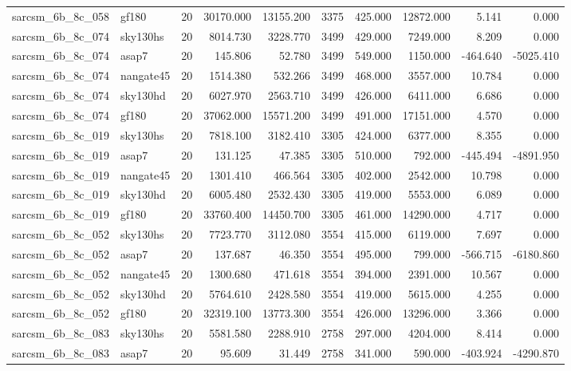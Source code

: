 \begin{tabular}{llrrrrrrrr}
sarcsm\_6b\_8c\_058 & gf180 & 20 & 30170.000 & 13155.200 & 3375 & 425.000 & 12872.000 & 5.141 & 0.000 \\
sarcsm\_6b\_8c\_074 & sky130hs & 20 & 8014.730 & 3228.770 & 3499 & 429.000 & 7249.000 & 8.209 & 0.000 \\
sarcsm\_6b\_8c\_074 & asap7 & 20 & 145.806 & 52.780 & 3499 & 549.000 & 1150.000 & -464.640 & -5025.410 \\
sarcsm\_6b\_8c\_074 & nangate45 & 20 & 1514.380 & 532.266 & 3499 & 468.000 & 3557.000 & 10.784 & 0.000 \\
sarcsm\_6b\_8c\_074 & sky130hd & 20 & 6027.970 & 2563.710 & 3499 & 426.000 & 6411.000 & 6.686 & 0.000 \\
sarcsm\_6b\_8c\_074 & gf180 & 20 & 37062.000 & 15571.200 & 3499 & 491.000 & 17151.000 & 4.570 & 0.000 \\
sarcsm\_6b\_8c\_019 & sky130hs & 20 & 7818.100 & 3182.410 & 3305 & 424.000 & 6377.000 & 8.355 & 0.000 \\
sarcsm\_6b\_8c\_019 & asap7 & 20 & 131.125 & 47.385 & 3305 & 510.000 & 792.000 & -445.494 & -4891.950 \\
sarcsm\_6b\_8c\_019 & nangate45 & 20 & 1301.410 & 466.564 & 3305 & 402.000 & 2542.000 & 10.798 & 0.000 \\
sarcsm\_6b\_8c\_019 & sky130hd & 20 & 6005.480 & 2532.430 & 3305 & 419.000 & 5553.000 & 6.089 & 0.000 \\
sarcsm\_6b\_8c\_019 & gf180 & 20 & 33760.400 & 14450.700 & 3305 & 461.000 & 14290.000 & 4.717 & 0.000 \\
sarcsm\_6b\_8c\_052 & sky130hs & 20 & 7723.770 & 3112.080 & 3554 & 415.000 & 6119.000 & 7.697 & 0.000 \\
sarcsm\_6b\_8c\_052 & asap7 & 20 & 137.687 & 46.350 & 3554 & 495.000 & 799.000 & -566.715 & -6180.860 \\
sarcsm\_6b\_8c\_052 & nangate45 & 20 & 1300.680 & 471.618 & 3554 & 394.000 & 2391.000 & 10.567 & 0.000 \\
sarcsm\_6b\_8c\_052 & sky130hd & 20 & 5764.610 & 2428.580 & 3554 & 419.000 & 5615.000 & 4.255 & 0.000 \\
sarcsm\_6b\_8c\_052 & gf180 & 20 & 32319.100 & 13773.300 & 3554 & 426.000 & 13296.000 & 3.366 & 0.000 \\
sarcsm\_6b\_8c\_083 & sky130hs & 20 & 5581.580 & 2288.910 & 2758 & 297.000 & 4204.000 & 8.414 & 0.000 \\
sarcsm\_6b\_8c\_083 & asap7 & 20 & 95.609 & 31.449 & 2758 & 341.000 & 590.000 & -403.924 & -4290.870 \\

\end{tabular}
